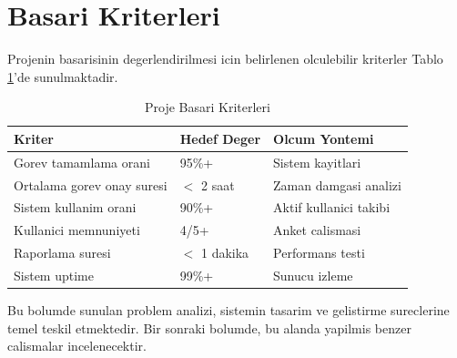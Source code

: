 \section{Basari Kriterleri}
\label{sec:basari-kriterleri}

Projenin basarisinin degerlendirilmesi icin belirlenen olculebilir 
kriterler Tablo \ref{tab:basari-kriterleri}'de sunulmaktadir.

\begin{table}[H]
\centering
\caption{Proje Basari Kriterleri}
\label{tab:basari-kriterleri}
\begin{tabular}{|p{4cm}|p{3cm}|p{4cm}|}
\hline
\textbf{Kriter} & \textbf{Hedef Deger} & \textbf{Olcum Yontemi} \\
\hline
Gorev tamamlama orani & 95\%+ & Sistem kayitlari \\
\hline
Ortalama gorev onay suresi & $<$ 2 saat & Zaman damgasi analizi \\
\hline
Sistem kullanim orani & 90\%+ & Aktif kullanici takibi \\
\hline
Kullanici memnuniyeti & 4/5+ & Anket calismasi \\
\hline
Raporlama suresi & $<$ 1 dakika & Performans testi \\
\hline
Sistem uptime & 99\%+ & Sunucu izleme \\
\hline
\end{tabular}
\end{table}

Bu bolumde sunulan problem analizi, sistemin tasarim ve gelistirme 
sureclerine temel teskil etmektedir. Bir sonraki bolumde, bu alanda 
yapilmis benzer calismalar incelenecektir.
